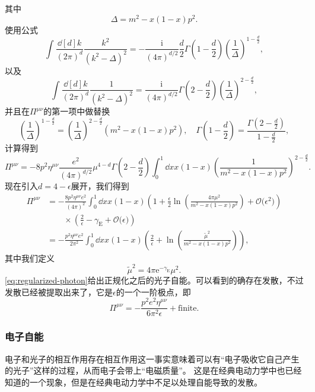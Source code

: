 \documentclass[hyperref, UTF8, a4paper]{ctexart}
\newcommand*{\ii}{\mathrm{i}}
\newcommand*{\ee}{\mathrm{e}}
\newcommand*{\bigO}[1]{\mathcal{O}{#1}}
\begin{document}
其中
\[
    \Delta = m^2 - x(1-x) p^2.
\]
使用公式
\[
    \int \frac{\dd[d]{k}}{(2\pi)^d} \frac{k^2}{(k^2 - \Delta)^2} = - \frac{\ii}{(4\pi)^{d/2}} \frac{d}{2} \Gamma\left(1 - \frac{d}{2}\right) \left(\frac{1}{\Delta}\right)^{1-\frac{d}{2}},
\]
以及
\[
    \int \frac{\dd[d]{k}}{(2\pi)^d} \frac{1}{(k^2 - \Delta)^2} = \frac{\ii}{(4\pi)^{d/2}} \Gamma\left(2 - \frac{d}{2} \right) \left(\frac{1}{\Delta}\right)^{2-\frac{d}{2}},
\]
并且在$\Pi^{\mu \nu}$的第一项中做替换
\[
    \left(\frac{1}{\Delta}\right)^{1-\frac{d}{2}} = \left(\frac{1}{\Delta}\right)^{2-\frac{d}{2}} (m^2 - x(1-x) p^2), \quad \Gamma\left(1 - \frac{d}{2}\right) = \frac{\Gamma\left(2 - \frac{d}{2}\right)}{1 - \frac{d}{2}},
\]
计算得到
\[
    \Pi^{\mu \nu} = - 8 p^2 \eta^{\mu \nu} \frac{e^2}{(4\pi)^{d/2}} \mu^{4-d} \Gamma\left(2 - \frac{d}{2}\right) \int_0^1 \dd{x} x(1-x) \left(\frac{1}{m^2 - x(1-x) p^2}\right)^{2 - \frac{d}{2}}.
\]
现在引入$d = 4 - \epsilon$展开，我们得到
\begin{equation}
    \begin{aligned}
        \Pi^{\mu \nu} &= - \frac{8 p^2 \eta^{\mu \nu} e^2}{(4\pi)^2} \int_0^1 \dd{x} x(1-x) \left( 1 + \frac{\epsilon}{2} \ln(\frac{4 \pi \mu^2}{m^2 - x(1-x) p^2}) + \bigO(\epsilon^2) \right) \\
        &\quad \quad \times \left( \frac{2}{\epsilon} - \gamma_\text{E} + \bigO(\epsilon) \right) \\
        &= - \frac{p^2 \eta^{\mu \nu} e^2}{2 \pi^2} \int_0^1 \dd{x} x(1 - x) \left( \frac{2}{\epsilon} + \ln(\frac{\tilde{\mu}^2}{m^2 - x(1-x) p^2}) \right),
    \end{aligned}
    \label{eq:regularized-photon}
\end{equation}
其中我们定义
\begin{equation}
    \tilde{\mu}^2 = 4 \pi \ee^{-\gamma_\text{E}} \mu^2.
\end{equation}
\eqref{eq:regularized-photon}给出正规化之后的光子自能。可以看到的确存在发散，不过发散已经被提取出来了，它是$\epsilon$的一个一阶极点，即
\begin{equation}
    \Pi^{\mu \nu} = - \frac{p^2 e^2 \eta^{\mu \nu}}{6 \pi^2 \epsilon} + \text{finite}.
    \label{eq:photon-one-loop-divergence}
\end{equation}

\subsubsection{电子自能}

电子和光子的相互作用存在相互作用这一事实意味着可以有“电子吸收它自己产生的光子”这样的过程，从而电子会带上“电磁质量”。
这是在经典电动力学中也已经知道的一个现象，但是在经典电动力学中不足以处理自能导致的发散。
\end{document}
